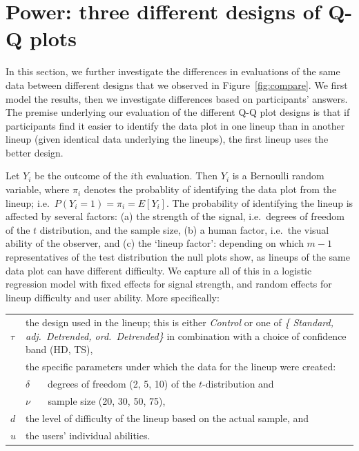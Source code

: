 \documentclass[12pt]{article}\usepackage[]{graphicx}\usepackage[]{color}
\begin{document}
\section{Power: three different designs of Q-Q plots}\label{sec:power1}

In this section, we further investigate the differences in evaluations of the same data between different designs that we observed in Figure~\ref{fig:compare}. We first model the results, then we investigate differences based on participants' answers.
The premise underlying our evaluation of the different Q-Q plot designs is that if participants find it easier to identify the data plot in one lineup than in another lineup (given identical data underlying the lineups), the first lineup uses the better design.

Let $Y_i$ be the outcome of the $i$th evaluation. Then $Y_i$ is a Bernoulli random variable, where $\pi_i$ denotes the probablity of identifying the data plot from the lineup; i.e.~$P(Y_i = 1) = \pi_i = E[Y_i]$.   
The probability of identifying the lineup is affected by several factors: (a) the strength of the signal, i.e.~degrees of freedom of the $t$ distribution, and the sample size, (b) a human factor, i.e.~the visual ability of the observer, and (c)  the `lineup factor': depending on which $m-1$ representatives of the test distribution the null plots show, as lineups of the same data plot can have different difficulty. We capture all of this in a logistic regression model with fixed effects for signal strength, and random effects for lineup difficulty and user ability. More specifically: 


\begin{center}
\begin{tabular}{lp{5in}}
$\tau$ & the design used in the lineup; this is either {\it Control} or one of  {\it \{  Standard, adj.\ Detrended, ord.\ Detrended\}} in combination with a choice of confidence band (HD, TS), \\
&  the specific parameters under which the data for the lineup were created: \\
&  $\delta$ \ \ \ degrees of freedom (2, 5, 10) {of the $t$-distribution} and \\
&  $\nu$  \ \ \ sample size (20, 30, 50, 75), \\
$d$ &  the level of difficulty of the lineup based on the actual sample, and \\
$u$ & the users' individual abilities.
 \end{tabular}
\end{center}
%
\end{document}
